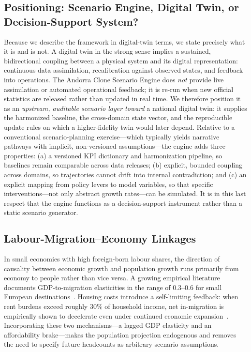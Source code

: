 \documentclass[urbansci,article,submit,pdftex,moreauthors]{Definitions/mdpi}
\begin{document}
\subsection{Positioning: Scenario Engine, Digital Twin, or Decision-Support System?}

Because we describe the framework in digital-twin terms, we state precisely what it
is and is not. A digital twin in the strong sense implies a sustained, bidirectional
coupling between a physical system and its digital representation: continuous data
assimilation, recalibration against observed states, and feedback into operations.
The Andorra Clone Scenario Engine does \emph{not} provide live assimilation or
automated operational feedback; it is re-run when new official statistics are
released rather than updated in real time. We therefore position it as an
\emph{upstream, auditable scenario layer toward} a national digital twin: it supplies
the harmonized baseline, the cross-domain state vector, and the reproducible update
rules on which a higher-fidelity twin would later depend. Relative to a conventional
scenario-planning exercise---which typically yields narrative pathways with implicit,
non-versioned assumptions---the engine adds three properties: (a) a versioned KPI
dictionary and harmonization pipeline, so baselines remain comparable across data
releases; (b) explicit, bounded coupling across domains, so trajectories cannot drift
into internal contradiction; and (c) an explicit mapping from policy levers to model
variables, so that specific interventions---not only abstract growth rates---can be
simulated. It is in this last respect that the engine functions as a decision-support
instrument rather than a static scenario generator.

\subsection{Labour-Migration--Economy Linkages}

In small economies with high foreign-born labour shares, the direction of
causality between economic growth and population growth runs primarily from
economy to people rather than vice versa. A growing empirical literature
documents GDP-to-migration elasticities in the range of 0.3--0.6 for small
European destinations~\cite{imf2025andorra,worldbank2024}. Housing costs
introduce a self-limiting feedback: when rent burdens exceed roughly 30\% of
household income, net in-migration is empirically shown to decelerate even
under continued economic expansion~\cite{Sa2015,Diamond2016}. Incorporating
these two mechanisms---a lagged GDP elasticity and an affordability
brake---makes the population projection endogenous and removes the need to
specify future headcounts as arbitrary scenario assumptions.
\end{document}
